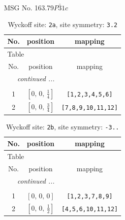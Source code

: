 \documentclass[fleqn,8pt]{jsarticle}
\begin{document}
\setcounter{MaxMatrixCols}{32}

\renewcommand{\tablename}{Table~}
\renewcommand{\figurename}{Figure~}
\begin{center}
\LARGE
MSG No. 163.79\quad$P\bar{3}1c$
\end{center}
\renewcommand{\arraystretch}{1.2}
\begin{longtable}{ccc}
\caption{Wyckoff site: {\tt 2a}, site symmetry: {\tt 3.2}}
 \\
 \hline \hline
No. & position & mapping \\ \hline \endfirsthead

\multicolumn{2}{l}{\tablename\ \thetable{}} \\
 \hline \hline
No. & position & mapping \\ \hline \endhead

 \hline \hline
\multicolumn{2}{r}{\footnotesize\it continued ...} \\ \endfoot

 \hline \hline
\multicolumn{2}{r}{} \\ \endlastfoot

1 & $\left[ 0,\, 0,\, \frac{1}{4} \right]$ & {\tt [1,2,3,4,5,6]} \\ \hline
2 & $\left[ 0,\, 0,\, \frac{3}{4} \right]$ & {\tt [7,8,9,10,11,12]} \\
\end{longtable}
\renewcommand{\arraystretch}{1.2}
\begin{longtable}{ccc}
\caption{Wyckoff site: {\tt 2b}, site symmetry: {\tt -3..}}
 \\
 \hline \hline
No. & position & mapping \\ \hline \endfirsthead

\multicolumn{2}{l}{\tablename\ \thetable{}} \\
 \hline \hline
No. & position & mapping \\ \hline \endhead

 \hline \hline
\multicolumn{2}{r}{\footnotesize\it continued ...} \\ \endfoot

 \hline \hline
\multicolumn{2}{r}{} \\ \endlastfoot

1 & $\left[ 0,\, 0,\, 0 \right]$ & {\tt [1,2,3,7,8,9]} \\ \hline
2 & $\left[ 0,\, 0,\, \frac{1}{2} \right]$ & {\tt [4,5,6,10,11,12]} \\
\end{longtable}
\renewcommand{\arraystretch}{1.2}
\end{document}
